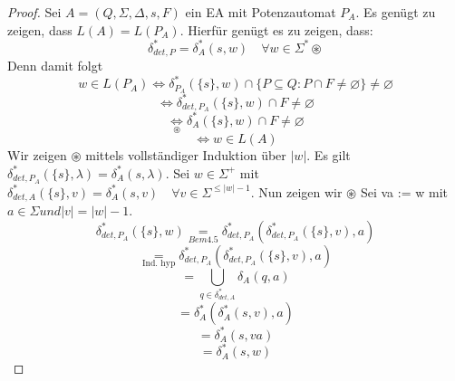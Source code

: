     \begin{proof}
        Sei \(A = (Q, \Sigma, \Delta, s, F)\) ein EA mit Potenzautomat \(P_{A}\). Es genügt zu zeigen, dass \(L(A) = L(P_{A})\). Hierfür genügt es zu zeigen, dass:
        \[
            \delta_{det,P}^{*} = \delta_{A}^{*}(s, w) \quad \forall w \in \Sigma^{*} \circledast 
        \]
        Denn damit folgt
        \[
            w \in  L (P_{A}) \Leftrightarrow \delta_{P_{A}}^{*}(\{s\}, w) \cap \{P\subseteq Q : P\cap F \neq \varnothing \} \neq \varnothing 
        \] 
        \[
            \Leftrightarrow \delta_{det, P_{A}}^{*}(\{s\}, w) \cap F \neq \varnothing 
        \]
        \[
            \underset{\circledast}{\Leftrightarrow } \delta_{A}^{*}(\{s\}, w) \cap F \neq \varnothing 
        \]
        \[
            \Leftrightarrow w \in L(A)
        \]
        Wir zeigen \(\circledast \) mittels vollständiger Induktion über \(\lvert w \rvert\). Es gilt \(\delta_{det, P_{A}}^{*}(\{s\}, \lambda) = \delta_{A}^{*}(s, \lambda)\). Sei \(w \in \Sigma^{+}\) mit \(\delta_{det, A}^{*}(\{s\}, v) = \delta_{A}^{*}(s, v) \quad \forall v \in \Sigma^{\leq \lvert w \rvert - 1}\). Nun zeigen wir \(\circledast \) Sei va := w mit \(a \in \Sigma und \lvert v \rvert = \lvert w \rvert - 1\).
        \[
            \delta_{det, P_{A}}^{*} (\{s\}, w) \underset{\hyperref[subsec:4.5]{Bem 4.5}}{=} \delta_{det, P_{A}}^{*} (\delta_{det, P_{A}}^{*}(\{s\}, v), a)
        \]
        \[
            \underset{\text{Ind. hyp}}{=} \delta_{det, P_{A}}^{*}(\delta_{det, P_{A}}^{*}(\{s\}, v), a)
        \]
        \[
            = \bigcup \limits_{q \in \delta_{det, A}^{*}}\delta_{A}(q, a)
        \]
        \[
        = \delta_{A}^{*}(\delta_{A}^{*}(s, v), a)
        \]
        \[ 
            = \delta_{A}^{*}(s, va)
        \]
        \[ 
            = \delta_{A}^{*}(s, w)
        \]
    \end{proof}
